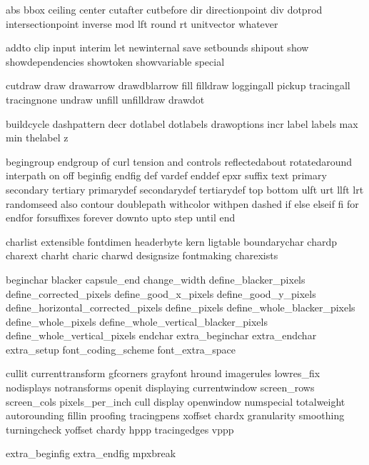\useprettyidentifiers \MPvariables \MPsetspecials
  abs bbox ceiling center cutafter cutbefore dir 
  directionpoint div dotprod intersectionpoint inverse mod lft
  round rt unitvector whatever 


\useprettyidentifiers \MPidentifiers \MPsetspecials
  addto clip input interim let newinternal save setbounds 
  shipout show showdependencies showtoken showvariable 
  special 

\useprettyidentifiers \MPvariables \MPsetspecials
  cutdraw draw drawarrow drawdblarrow fill filldraw 
  loggingall pickup tracingall tracingnone undraw unfill 
  unfilldraw drawdot 


\useprettyidentifiers \MPvariables \MPsetspecials
  buildcycle dashpattern decr dotlabel dotlabels drawoptions
  incr label labels max min thelabel z 


\useprettyidentifiers \MPidentifiers \MPsetspecials
  begingroup endgroup of curl tension and controls 
  reflectedabout rotatedaround interpath on off beginfig 
  endfig def vardef enddef epxr suffix text primary secondary 
  tertiary primarydef secondarydef tertiarydef top bottom 
  ulft urt llft lrt randomseed also contour doublepath 
  withcolor withpen dashed if else elseif fi for endfor 
  forsuffixes forever downto upto step until end


\useprettyidentifiers \MPidentifiers \MPsetspecials
  charlist extensible fontdimen headerbyte kern ligtable 
  boundarychar chardp charext charht charic charwd designsize 
  fontmaking charexists 

\useprettyidentifiers \MPvariables \MPsetspecials
  beginchar blacker capsule_end change_width 
  define_blacker_pixels define_corrected_pixels 
  define_good_x_pixels define_good_y_pixels 
  define_horizontal_corrected_pixels define_pixels 
  define_whole_blacker_pixels define_whole_pixels 
  define_whole_vertical_blacker_pixels 
  define_whole_vertical_pixels endchar extra_beginchar 
  extra_endchar extra_setup font_coding_scheme 
  font_extra_space 


\useprettyidentifiers \MPidentifiers \MPsetspecials
  cullit currenttransform gfcorners grayfont hround 
  imagerules lowres_fix nodisplays notransforms openit 
  displaying currentwindow screen_rows screen_cols 
  pixels_per_inch cull display openwindow numspecial 
  totalweight autorounding fillin proofing tracingpens 
  xoffset chardx granularity smoothing turningcheck yoffset 
  chardy hppp tracingedges vppp


\useprettyidentifiers \MPidentifiers \MPsetspecials
  extra_beginfig extra_endfig mpxbreak 

\protect 

\endinput 
